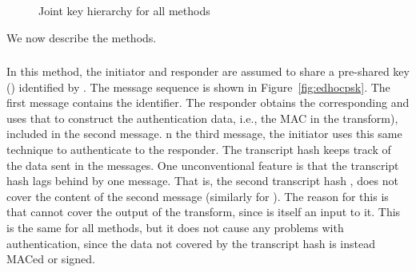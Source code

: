 \begin{figure}[!h]
\centering
\scalebox{.75}{
\linespread{1}

}
\caption{Joint key hierarchy for all methods}
\label{fig:kdfdiagram}
\end{figure}

We now describe the \mEdhoc{} methods.
%
%

\subsubsection{\mPskPsk{}}
In this method, the initiator and responder are assumed to share a pre-shared
key (\mPsk) identified by \mIDPsk.
%
The message sequence is shown in Figure~\ref{fig:edhocpsk}.
%
The first message contains the \mIDPsk{} identifier.
%
The responder obtains the corresponding \mPsk{} and uses that to construct the
authentication data, i.e., the MAC in the \mAead{} transform), included in
the second message.
%
n the third message, the initiator uses this same technique to authenticate
to the responder.
%
The transcript hash \mTH{} keeps track of the data sent in the messages.
%
One unconventional feature is that the transcript hash lags behind by one
message.
%
That is, the second transcript hash \mTHtwo{}, does not cover the content of
the second message (similarly for \mTHthree).
%
The reason for this is that \mTHtwo{} cannot cover the output of the
\mAead{} transform, since \mTHtwo{} is itself an input to it.
%
This is the same for all methods, but it does not cause any problems with
authentication, since the data not covered by the transcript hash is
instead MACed or signed.
%

